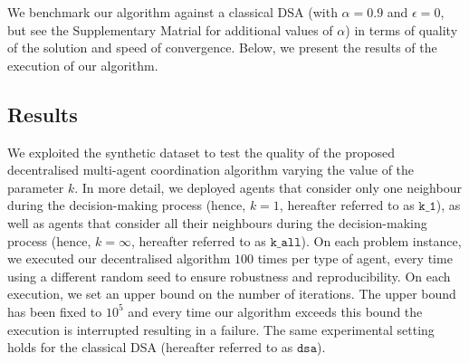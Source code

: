 
We benchmark our algorithm against a classical DSA (with $\alpha = 0.9$ and $\epsilon = 0$, but see the Supplementary Matrial for additional values of $\alpha$) in terms of quality of the solution and speed of convergence. Below, we present the results of the execution of our algorithm. 



\subsection{Results}\label{subsec:res}

%
We exploited the synthetic dataset to test the quality of the proposed decentralised multi-agent coordination algorithm varying the value of the parameter $k$. In more detail, we deployed agents that consider only one neighbour during the decision-making process (hence, $k=1$, hereafter referred to as $\texttt{k\_1}$), as well as agents that consider all their neighbours during the decision-making process (hence, $k=\infty$, hereafter referred to as $\texttt{k\_all}$). 
%
On each problem instance, we executed our decentralised algorithm $100$ times per type of agent, every time using a different random seed to ensure robustness and reproducibility. On each execution, we set an upper bound on the number of iterations. The upper bound has been fixed to $10^5$ and every time our algorithm exceeds this bound the execution is interrupted resulting in a failure.
%
The same experimental setting holds for the classical DSA (hereafter referred to as $\texttt{dsa}$).

